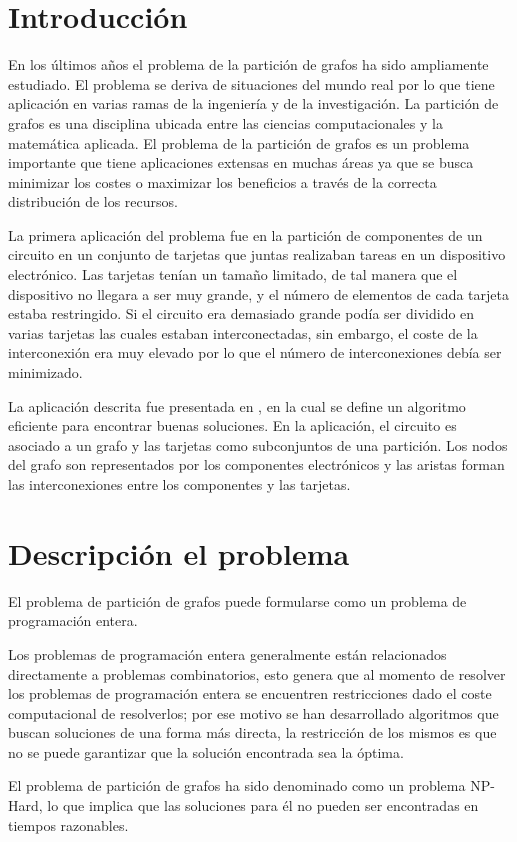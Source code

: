 \section{Introducción}
En los últimos años el problema de la partición de grafos ha sido ampliamente estudiado. El problema se deriva de situaciones del mundo real por lo que tiene aplicación en varias ramas de la ingeniería y de la investigación. La partición de grafos es una disciplina ubicada entre las ciencias computacionales y la matemática aplicada. El problema de la partición de grafos es un problema importante que tiene aplicaciones extensas en muchas áreas ya que se busca minimizar los costes o maximizar los beneficios a través de la correcta distribución de los recursos. 

La primera aplicación del problema fue en la partición de componentes de un circuito en un conjunto de tarjetas que juntas realizaban tareas en un dispositivo electrónico. Las tarjetas tenían un tamaño limitado, de tal manera que el dispositivo no llegara a ser muy grande, y el número de elementos de cada tarjeta estaba restringido. Si el circuito era demasiado grande podía ser dividido en varias tarjetas las cuales estaban interconectadas, sin embargo, el coste de la interconexión era muy elevado por lo que el número de interconexiones debía ser minimizado.

La aplicación descrita fue presentada en \cite{KernighanLin}, en la cual se define un algoritmo eficiente para encontrar buenas soluciones. En la aplicación, el circuito es asociado a un grafo y las tarjetas como subconjuntos de una partición. Los nodos del grafo son representados por los componentes electrónicos y las aristas forman las interconexiones entre los componentes y las tarjetas.

\section{Descripción el problema}

El problema de partición de grafos puede formularse como un problema de programación entera. 

Los problemas de programación entera generalmente están relacionados directamente a problemas combinatorios, esto genera que al momento de resolver los problemas de programación entera se encuentren restricciones dado el coste computacional de resolverlos; por ese motivo se han desarrollado algoritmos que buscan soluciones de una forma más directa, la restricción de los mismos es que no se puede garantizar que la solución encontrada sea la óptima. 

El problema de partición de grafos ha sido denominado como un problema NP-Hard\cite{Karypis}, lo que implica que las soluciones para él no pueden ser encontradas en tiempos razonables.

